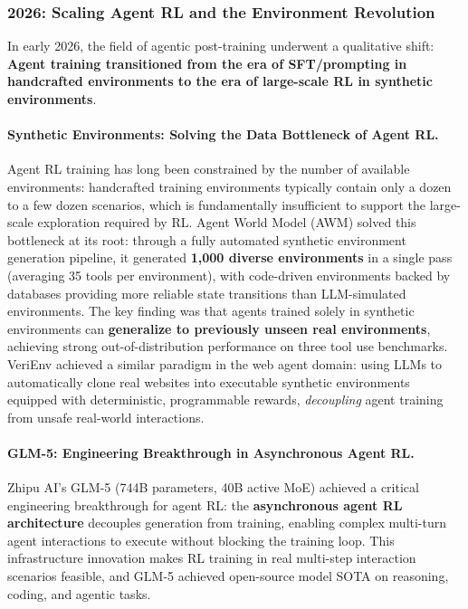 \subsubsection{2026: Scaling Agent RL and the Environment Revolution}
\label{sec:t6-2026}

In early 2026, the field of agentic post-training underwent a qualitative shift:
\textbf{Agent training transitioned from the era of SFT/prompting in handcrafted environments
to the era of large-scale RL in synthetic environments}.

\paragraph{Synthetic Environments: Solving the Data Bottleneck of Agent RL.}
Agent RL training has long been constrained by the number of available environments:
handcrafted training environments typically contain only a dozen to a few dozen scenarios,
which is fundamentally insufficient to support the large-scale exploration required by RL.
 Agent World Model (AWM)
solved this bottleneck at its root:
through a fully automated synthetic environment generation pipeline,
it generated \textbf{1,000 diverse environments} in a single pass (averaging 35 tools per environment),
with code-driven environments backed by databases
providing more reliable state transitions than LLM-simulated environments.
The key finding was that agents trained solely in synthetic environments
can \textbf{generalize to previously unseen real environments},
achieving strong out-of-distribution performance on three tool use benchmarks.
VeriEnv \cite{chae2026verienv} achieved a similar paradigm in the web agent domain:
using LLMs to automatically clone real websites into executable synthetic environments
equipped with deterministic, programmable rewards,
\emph{decoupling} agent training from unsafe real-world interactions.


\paragraph{GLM-5: Engineering Breakthrough in Asynchronous Agent RL.}
Zhipu AI's GLM-5 (744B parameters, 40B active MoE)
achieved a critical engineering breakthrough for agent RL:
the \textbf{asynchronous agent RL architecture} decouples generation from training,
enabling complex multi-turn agent interactions to execute without blocking the training loop.
This infrastructure innovation makes RL training in real multi-step interaction scenarios feasible,
and GLM-5 achieved open-source model SOTA on reasoning, coding, and agentic tasks.

